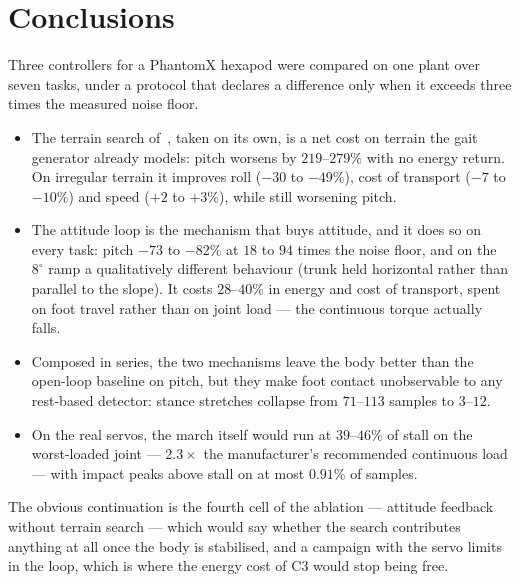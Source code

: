 \documentclass[11pt,a4paper]{article}
\newcommand{\Cth}{\textsf{C3}}
\begin{document}
\section{Conclusions}
\label{sec:conclusions}

Three controllers for a PhantomX hexapod were compared on one plant over seven
tasks, under a protocol that declares a difference only when it exceeds three
times the measured noise floor.

\begin{itemize}
\item The terrain search of~\cite{arrigoni2024}, taken on its own, is a net
cost on terrain the gait generator already models: pitch worsens by
$219$--$279\%$ with no energy return. On irregular terrain it improves roll
($-30$ to $-49\%$), cost of transport ($-7$ to $-10\%$) and speed
($+2$ to $+3\%$), while still worsening pitch.
\item The attitude loop is the mechanism that buys attitude, and it does so on
every task: pitch $-73$ to $-82\%$ at $18$ to $94$ times the noise floor, and
on the $8^\circ$ ramp a qualitatively different behaviour (trunk held
horizontal rather than parallel to the slope). It costs $28$--$40\%$ in energy
and cost of transport, spent on foot travel rather than on joint load --- the
continuous torque actually falls.
\item Composed in series, the two mechanisms leave the body better than the
open-loop baseline on pitch, but they make foot contact unobservable to any
rest-based detector: stance stretches collapse from $71$--$113$ samples to
$3$--$12$.
\item On the real servos, the march itself would run at $39$--$46\%$ of stall
on the worst-loaded joint --- $2.3\times$ the manufacturer's recommended
continuous load --- with impact peaks above stall on at most $0.91\%$ of
samples.
\end{itemize}

The obvious continuation is the fourth cell of the ablation --- attitude
feedback without terrain search --- which would say whether the search
contributes anything at all once the body is stabilised, and a campaign with
the servo limits in the loop, which is where the energy cost of \Cth{} would
stop being free.
\end{document}
